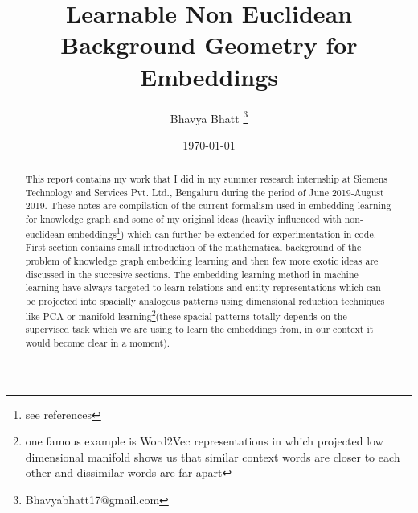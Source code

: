 \documentclass[12pt]{article}
\title{Learnable Non Euclidean Background Geometry for Embeddings}
\author[1]{Bhavya Bhatt \thanks{Bhavyabhatt17@gmail.com}}
\affil[1]{Indian Institute of Technology Mandi, Mandi 175005, India}
\date{\today}
\begin{document}
\maketitle

\begin{abstract}
This report contains my work that I did in my summer research internship at Siemens Technology and Services Pvt. Ltd., Bengaluru during the period of June 2019-August 2019. These notes are compilation of the current formalism used in embedding learning for knowledge graph and some of my original ideas (heavily influenced with non-euclidean embeddings\footnote{see references}) which can further be extended for experimentation in code. First section contains small introduction of the mathematical background of the problem of knowledge graph embedding learning and then few more exotic ideas are discussed in the succesive sections. The embedding learning method in machine learning have always targeted to learn relations and entity representations which can be projected into spacially analogous patterns using dimensional reduction techniques like PCA or manifold learning\footnote{one famous example is Word2Vec representations in which projected low dimensional manifold shows us that similar context words are closer to each other and dissimilar words are far apart}(these spacial patterns totally depends on the supervised task which we are using to learn the embeddings from, in our context it would become clear in a moment).
\end{abstract}

\newpage

\tableofcontents
\newpage
\end{document}

